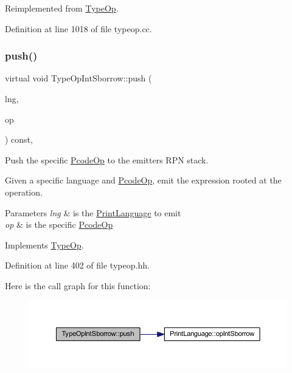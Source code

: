 Reimplemented from \mbox{\hyperlink{class_type_op_a42a1ffa77f998df24efdb44405b33ac5}{Type\+Op}}.



Definition at line 1018 of file typeop.\+cc.

\mbox{\label{class_type_op_int_sborrow_a7740e907f2867bcb2e15285232fc9b50}} 
\subsubsection{\texorpdfstring{push()}{push()}}
{\footnotesize\ttfamily virtual void Type\+Op\+Int\+Sborrow\+::push (\begin{DoxyParamCaption}\item[{\mbox{\hyperlink{class_print_language}{Print\+Language}} $\ast$}]{lng,  }\item[{const \mbox{\hyperlink{class_pcode_op}{Pcode\+Op}} $\ast$}]{op }\end{DoxyParamCaption}) const\hspace{0.3cm}{\ttfamily [inline]}, {\ttfamily [virtual]}}



Push the specific \mbox{\hyperlink{class_pcode_op}{Pcode\+Op}} to the emitter\textquotesingle{}s R\+PN stack. 

Given a specific language and \mbox{\hyperlink{class_pcode_op}{Pcode\+Op}}, emit the expression rooted at the operation. 
\begin{DoxyParams}{Parameters}
{\em lng} & is the \mbox{\hyperlink{class_print_language}{Print\+Language}} to emit \\
\hline
{\em op} & is the specific \mbox{\hyperlink{class_pcode_op}{Pcode\+Op}} \\
\hline
\end{DoxyParams}


Implements \mbox{\hyperlink{class_type_op_ac9c9544203ed74dabe6ac662b653b2af}{Type\+Op}}.



Definition at line 402 of file typeop.\+hh.

Here is the call graph for this function\+:
\nopagebreak
\begin{figure}[H]
\begin{center}
\leavevmode
\includegraphics[width=350pt]{class_type_op_int_sborrow_a7740e907f2867bcb2e15285232fc9b50_cgraph}
\end{center}
\end{figure}



